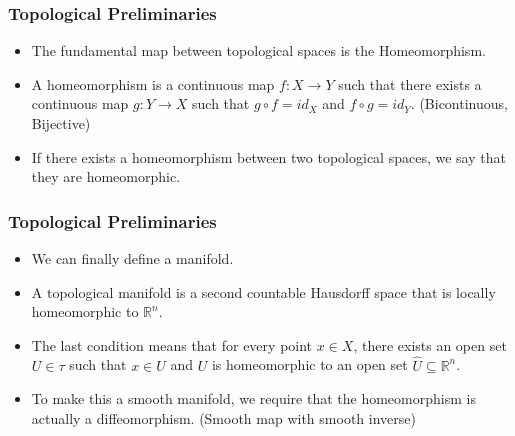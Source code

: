 \documentclass{beamer}
\begin{document}
\begin{frame}%

\frametitle{Topological Preliminaries}

\begin{itemize}

\item The fundamental map between topological spaces is the Homeomorphism.

\pause

\item A homeomorphism is a continuous map $f: X \to Y$ such that there exists a continuous map
  $g: Y \to X$ such that $g \circ f = id_X$ and $f \circ g = id_Y$. (Bicontinuous, Bijective)

\pause

\item If there exists a homeomorphism between two topological spaces, we say that they are
  homeomorphic.

\end{itemize}

\end{frame}
\begin{frame}%

\frametitle{Topological Preliminaries}

\begin{itemize}

\item We can finally define a manifold.

\pause

\item A topological manifold is a second countable Hausdorff space that is locally
  homeomorphic to $\mathbb{R}^n$.

\pause

\item The last condition means that for every point $x \in X$, there exists an open set $U \in \tau$
  such that $x \in U$ and $U$ is homeomorphic to an open set $\hat{U} \subseteq \mathbb{R}^n$.

\item To make this a smooth manifold, we require that the homeomorphism is actually a
  diffeomorphism. (Smooth map with smooth inverse)

\end{itemize}

\end{frame}
\end{document}
